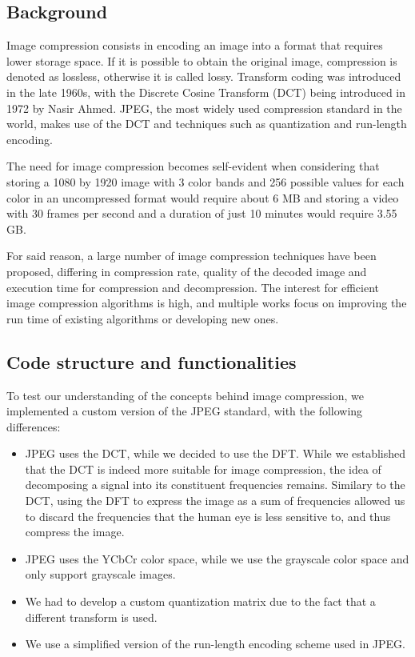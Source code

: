 \subsection{Background}
Image compression consists in encoding an image into a format that requires lower storage space. If it is possible to obtain the original image, compression is denoted as lossless, otherwise it is called lossy. Transform coding was introduced in the late 1960s, with the Discrete Cosine Transform (DCT) being introduced in 1972 by Nasir Ahmed\cite{dct}. JPEG\cite{jpeg}, the most widely used compression standard in the world\cite{jpeg_popular}, makes use of the DCT and techniques such as quantization and run-length encoding.

The need for image compression becomes self-evident when considering that storing a 1080 by 1920 image with 3 color bands and 256 possible values for each color in an uncompressed format would require about 6 MB and storing a video with 30 frames per second and a duration of just 10 minutes would require 3.55 GB. 

For said reason, a large number of image compression techniques have been proposed\cite{compression_list_1}\cite{compression_list_2}\cite{compression_wavelet}, differing in compression rate, quality of the decoded image and execution time for compression and decompression. The interest for efficient image compression algorithms is high, and multiple works focus on improving the run time of existing algorithms or developing new ones\cite{compression_optimize_1}\cite{compression_optimize_2}.

\subsection{Code structure and functionalities}
To test our understanding of the concepts behind image compression, we implemented a custom version of the JPEG standard, with the following differences:
\begin{itemize}
    \item JPEG uses the DCT, while we decided to use the DFT. While we established that the DCT is indeed more suitable for image compression, the idea of decomposing a signal into its constituent frequencies remains. Similary to the DCT, using the DFT to express the image as a sum of frequencies allowed us to discard the frequencies that the human eye is less sensitive to, and thus compress the image.
    \item JPEG uses the YCbCr color space, while we use the grayscale color space and only support grayscale images.
    \item We had to develop a custom quantization matrix due to the fact that a different transform is used.
    \item We use a simplified version of the run-length encoding scheme used in JPEG.
\end{itemize}

